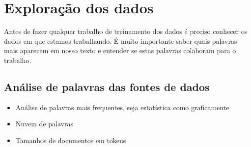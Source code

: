 \section{Exploração dos dados}

Antes de fazer qualquer trabalho de treinamento dos dados é preciso conhecer os dados em que estamos trabalhando. É muito importante saber quais 
palavras mais aparecem em nosso texto e entender se estas palavras colaboram para o trabalho.

\subsection{Análise de palavras das fontes de dados}

\begin{itemize}
    \item Análise de palavras mais frequentes, seja estatística como graficamente
    \item Nuvem de palavras
    \item Tamanhos de documentos em tokens
\end{itemize}